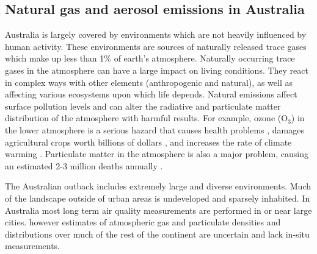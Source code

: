 \subsection{Natural gas and aerosol emissions in Australia}

Australia is largely covered by environments which are not heavily influenced by human activity.
These environments are sources of naturally released trace gases which make up less than 1\% of earth's atmosphere.
Naturally occurring trace gases in the atmosphere can have a large impact on living conditions.
They react in complex ways with other elements (anthropogenic and natural), as well as affecting various ecosystems upon which life depends.
Natural emissions affect surface pollution levels and can alter the radiative and particulate matter distribution of the atmosphere with harmful results.
For example, ozone (O$_3$) in the lower atmosphere is a serious hazard that causes health problems \cite{Hsieh_2013}, damages agricultural crops worth billions of dollars \cite{Avnery_2011}, and increases the rate of climate warming \cite{IPCC_2013_chap8}.
Particulate matter in the atmosphere is also a major problem, causing an estimated 2-3 million deaths annually \cite{Hoek_2013, 19627030, Silva_2013, Lelieveld_2015}.

The Australian outback includes extremely large and diverse environments.
Much of the landscape outside of urban areas is undeveloped and sparsely inhabited.
In Australia most long term air quality measurements are performed in or near large cities.
however estimates of atmospheric gas and particulate densities and distributions over much of the rest of the continent are uncertain and lack in-situ measurements.
